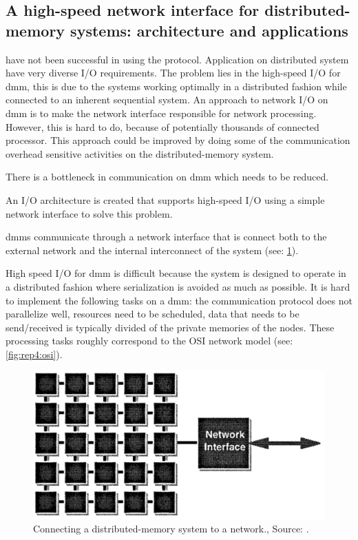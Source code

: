 
\subsection{A high-speed network interface for distributed-memory systems: architecture and applications \cite{steenkiste1997high}} \label{ss:steenkiste1997high}

 have not been successful in using the  protocol.
Application on distributed system have very diverse I/O requirements.
The problem lies in the high-speed I/O for \ac{dmm}, this is due to the systems working optimally in a distributed fashion while connected to an inherent sequential system.
An approach to network I/O on \ac{dmm} is to make the network interface responsible for network processing.
However, this is hard to do, because of potentially thousands of connected processor.
This approach could be improved by doing some of the communication overhead sensitive activities on the distributed-memory system.

\motive
There is a bottleneck in communication on \acs{dmm} which needs to be reduced.

\objective
An I/O architecture is created that supports high-speed I/O using a simple network interface to solve this problem.

\summary
\Ac{dmm}s communicate through a network interface that is connect both to the external network and the internal interconnect of the system (see: \cref{fig:rep4:conndistrmem}).

High speed I/O for \ac{dmm} is difficult because the system is designed to operate in a distributed fashion where serialization is avoided as much as possible.
It is hard to implement the following tasks on a \ac{dmm}: the communication protocol does not parallelize well, resources need to be scheduled, data that needs to be send/received is typically divided of the private memories of the  nodes.
These processing tasks roughly correspond to the OSI network model (see: \cref{fig:rep4:osi}).


\begin{figure}
	\centering
	\includegraphics[width=0.95\linewidth]{Figures/Rep4DistrMemSys.png}
	\caption{Connecting a distributed-memory system to a network., Source: \cite{steenkiste1997high}.} 
    \label{fig:rep4:conndistrmem}
\end{figure}

